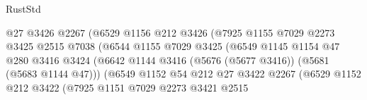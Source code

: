 \begin{lexlean}{RustStd}
\begin{coremodule}
                                          @27
                                          @3426
                                          @2267
                                          (@6529
                                            @1156
                                            @212
                                            @3426
                                            (@7925
                                              @1155
                                              @7029
                                              @2273
                                              @3425
                                              @2515
                                              @7038
                                              (@6544
                                                @1155
                                                @7029
                                                @3425
                                                (@6549
                                                  @1145
                                                  @1154
                                                  @47
                                                  @280
                                                  @3416
                                                  @3424
                                                  (@6642
                                                    @1144
                                                    @3416
                                                    (@5676 (@5677 @3416))
                                                    (@5681 (@5683 @1144 @47)))
                                                  (@6549
                                                    @1152
                                                    @54
                                                    @212
                                                    @27
                                                    @3422
                                                    @2267
                                                    (@6529
                                                      @1152
                                                      @212
                                                      @3422
                                                      (@7925
                                                        @1151
                                                        @7029
                                                        @2273
                                                        @3421
                                                        @2515

\end{coremodule}
\end{lexlean}
